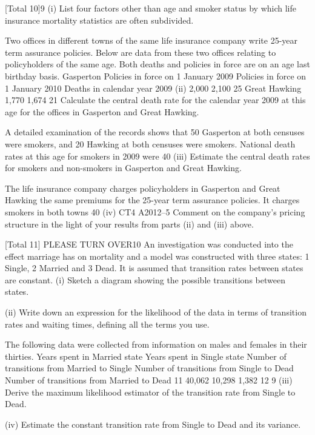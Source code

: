 [Total 10]9
(i)
List four factors other than age and smoker status by which life insurance
mortality statistics are often subdivided.

Two offices in different towns of the same life insurance company write 25-year term
assurance policies. Below are data from these two offices relating to policyholders of
the same age. Both deaths and policies in force are on an age last birthday basis.
Gasperton
Policies in force on 1 January 2009
Policies in force on 1 January 2010
Deaths in calendar year 2009
(ii)
2,000
2,100
25
Great Hawking
1,770
1,674
21
Calculate the central death rate for the calendar year 2009 at this age for the
offices in Gasperton and Great Hawking.

A detailed examination of the records shows that 50%
Gasperton at both censuses were smokers, and 20%
Hawking at both censuses were smokers. National death rates at this age for smokers
in 2009 were 40%
(iii)
Estimate the central death rates for smokers and non-smokers in Gasperton
and Great Hawking.

The life insurance company charges policyholders in Gasperton and Great Hawking
the same premiums for the 25-year term assurance policies. It charges smokers in
both towns 40%
(iv)
CT4 A2012–5
Comment on the company’s pricing structure in the light of your results from
parts (ii) and (iii) above.

[Total 11]
PLEASE TURN OVER10
An investigation was conducted into the effect marriage has on mortality and a model
was constructed with three states: 1 Single, 2 Married and 3 Dead. It is assumed that
transition rates between states are constant.
(i) Sketch a diagram showing the possible transitions between states.

(ii) Write down an expression for the likelihood of the data in terms of transition
rates and waiting times, defining all the terms you use.

The following data were collected from information on males and females in their
thirties.
Years spent in Married state
Years spent in Single state
Number of transitions from Married to Single
Number of transitions from Single to Dead
Number of transitions from Married to Dead
11
40,062
10,298
1,382
12
9
(iii) Derive the maximum likelihood estimator of the transition rate from Single to
Dead.

(iv) Estimate the constant transition rate from Single to Dead and its variance. 


